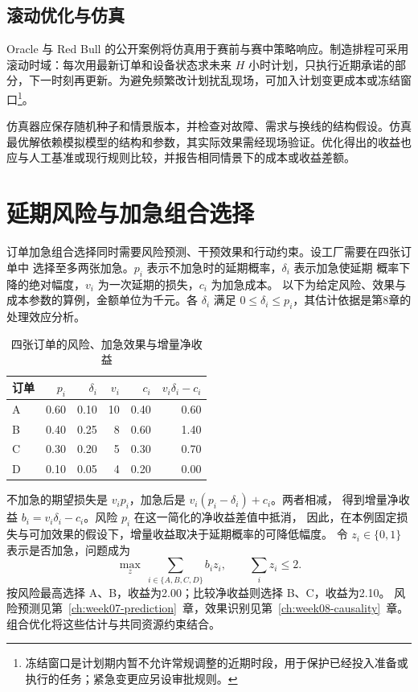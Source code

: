 \subsection{滚动优化与仿真}
Oracle 与 Red Bull 的公开案例将仿真用于赛前与赛中策略响应\cite{oracle01}。制造排程可采用滚动时域：每次用最新订单和设备状态求未来 \(H\) 小时计划，只执行近期承诺的部分，下一时刻再更新。为避免频繁改计划扰乱现场，可加入计划变更成本或冻结窗口\footnote{冻结窗口是计划期内暂不允许常规调整的近期时段，用于保护已经投入准备或执行的任务；紧急变更应另设审批规则。}。

仿真器应保存随机种子和情景版本，并检查对故障、需求与换线的结构假设。仿真最优解依赖模拟模型的结构和参数，其实际效果需经现场验证。优化得出的收益也应与人工基准或现行规则比较，并报告相同情景下的成本或收益差额。

\section{延期风险与加急组合选择}
\label{sec:expedite-choice}
订单加急组合选择同时需要风险预测、干预效果和行动约束。设工厂需要在四张订单中
选择至多两张加急。\(p_i\) 表示不加急时的延期概率，\(\delta_i\) 表示加急使延期
概率下降的绝对幅度，\(v_i\) 为一次延期的损失，\(c_i\) 为加急成本。
以下为给定风险、效果与成本参数的算例，金额单位为千元。各 \(\delta_i\) 满足
\(0\le\delta_i\le p_i\)，其估计依据是第8章的处理效应分析。

\begin{table}[htbp]
\centering
\caption{四张订单的风险、加急效果与增量净收益}
\label{tab:expedite-choice}
\begin{tabular}{lrrrrr}
\toprule
\rowcolor{BDMTableHead}
订单 & \(p_i\) & \(\delta_i\) & \(v_i\) & \(c_i\) & \(v_i\delta_i-c_i\)\\
\midrule
A & 0.60 & 0.10 & 10 & 0.40 & 0.60\\
B & 0.40 & 0.25 & 8 & 0.60 & 1.40\\
C & 0.30 & 0.20 & 5 & 0.30 & 0.70\\
D & 0.10 & 0.05 & 4 & 0.20 & 0.00\\
\bottomrule
\end{tabular}
\end{table}

不加急的期望损失是 \(v_ip_i\)，加急后是 \(v_i(p_i-\delta_i)+c_i\)。两者相减，
得到增量净收益 \(b_i=v_i\delta_i-c_i\)。风险 \(p_i\) 在这一简化的净收益差值中抵消，
因此，在本例固定损失与可加效果的假设下，增量收益取决于延期概率的可降低幅度。
令 \(z_i\in\{0,1\}\) 表示是否加急，问题成为
\begin{equation}
\max_z\ \sum_{i\in\{A,B,C,D\}}b_iz_i,
\qquad \sum_i z_i\le2.
\label{eq:expedite-knapsack}
\end{equation}
按风险最高选择 A、B，收益为2.00；比较净收益则选择 B、C，收益为2.10。
风险预测见第~\ref{ch:week07-prediction}~章，效果识别见第~\ref{ch:week08-causality}~章。
组合优化将这些估计与共同资源约束结合。

